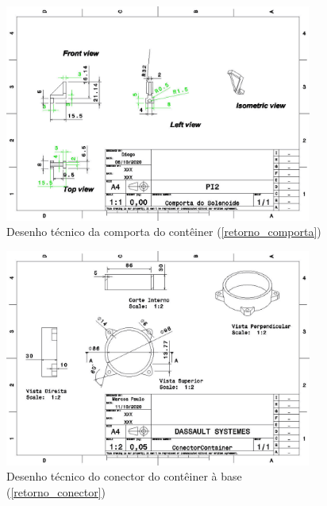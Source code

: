 \begin{apendicesenv}
\begin{figure}[H]
    \centering
    \includegraphics[width=0.9\textwidth]{figuras/estrutura/Desenhos/Drawing1_Comporta_do_Solenoide.jpg}
    \caption{Desenho técnico da comporta do contêiner (\ref{retorno_comporta})}
    \label{fig:comporta}
\end{figure}

\begin{figure}[H]
    \centering
    \includegraphics[width=0.9\textwidth]{figuras/estrutura/Desenhos/ConectorContainer.jpg}
    \caption{Desenho técnico do conector do contêiner à base (\ref{retorno_conector})}
    \label{fig:conector}
\end{figure}


\end{apendicesenv}
